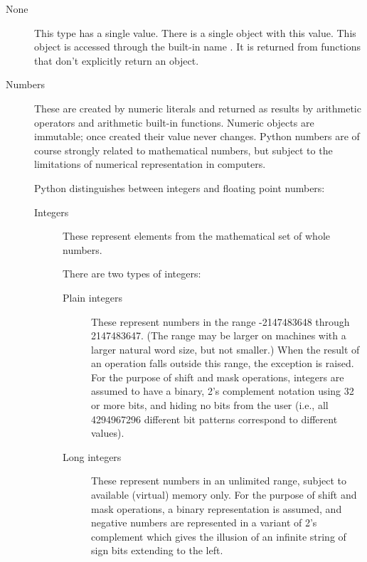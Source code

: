 \begin{description}

\item[None]
This type has a single value.  There is a single object with this value.
This object is accessed through the built-in name \verb@None@.
It is returned from functions that don't explicitly return an object.

\item[Numbers]
These are created by numeric literals and returned as results by
arithmetic operators and arithmetic built-in functions.  Numeric
objects are immutable; once created their value never changes.  Python
numbers are of course strongly related to mathematical numbers, but
subject to the limitations of numerical representation in computers.

Python distinguishes between integers and floating point numbers:

\begin{description}
\item[Integers]
These represent elements from the mathematical set of whole numbers.

There are two types of integers:

\begin{description}

\item[Plain integers]
These represent numbers in the range -2147483648 through 2147483647.
(The range may be larger on machines with a larger natural word
size, but not smaller.)
When the result of an operation falls outside this range, the
exception \verb@OverflowError@ is raised.
For the purpose of shift and mask operations, integers are assumed to
have a binary, 2's complement notation using 32 or more bits, and
hiding no bits from the user (i.e., all 4294967296 different bit
patterns correspond to different values).

\item[Long integers]
These represent numbers in an unlimited range, subject to available
(virtual) memory only.  For the purpose of shift and mask operations,
a binary representation is assumed, and negative numbers are
represented in a variant of 2's complement which gives the illusion of
an infinite string of sign bits extending to the left.

\end{description} %


\end{description}
\end{description}

